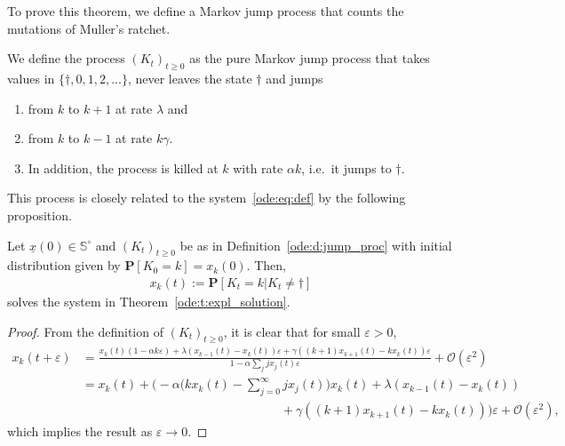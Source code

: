 \noindent
To prove this theorem, we define a Markov jump process that counts the
mutations of Muller's ratchet.

\begin{Definition}
\label{ode:d:jump_proc}
We define the process $(K_t)_{t\geq 0}$ as the pure Markov jump process that 
takes values in $\{\dagger, 0,1,2,...\}$, never leaves the state $\dagger$ and jumps
\begin{enumerate}
  \item from $k$ to $k+1$ at rate $\lambda$ and
  \item from $k$ to $k-1$ at rate $k\gamma$.
  \item In addition, the process is killed at $k$ with rate $\alpha k$,
    i.e.\ it jumps to $\dagger$.
\end{enumerate}
\end{Definition}

\noindent
This process is closely related to the system~\eqref{ode:eq:def} by the following proposition.

\begin{Proposition}\label{ode:p:particle}
Let $\underline x(0) \in \mathbb S^\circ$ and $(K_t)_{t\geq 0}$ be
as in Definition~\ref{ode:d:jump_proc} with initial distribution given by
$\mathbf P[K_0=k] = x_k(0)$. 
Then,
\begin{align}\label{eq:ode:repr}
 x_k(t) := \mathbf P[K_t=k|K_t\neq \dagger]
\end{align}
solves the system in Theorem~\ref{ode:t:expl_solution}.
\end{Proposition}

\begin{proof}
From the definition of $(K_t)_{t\geq 0}$, it is clear that for small $\varepsilon>0$,
\small
\begin{align*}
x_k (t+\varepsilon) 
& = \frac{x_k(t)(1-\alpha k \varepsilon) + \lambda(x_{k-1}(t) - x_k(t)) \varepsilon + \gamma
    ((k+1)x_{k+1}(t) - kx_k(t)) \varepsilon}{1-\alpha \sum_j j
    x_j(t) \varepsilon} + \mathcal O(\varepsilon^2)\\ 
& = x_k(t) +
    \Big( -\alpha \Big(k x_k(t) - \sum_{j=0}^\infty j x_j(t)\Big)
    x_k(t) + \lambda(x_{k-1}(t) - x_k(t)) \\ 
& \qquad \qquad \qquad \qquad \qquad \qquad \qquad \qquad + \gamma
    ((k+1)x_{k+1}(t) - k x_k(t))\Big)\varepsilon + \mathcal
    O(\varepsilon^2),
\end{align*}
\normalsize
which implies the result as $\varepsilon\to 0$.
\end{proof}

